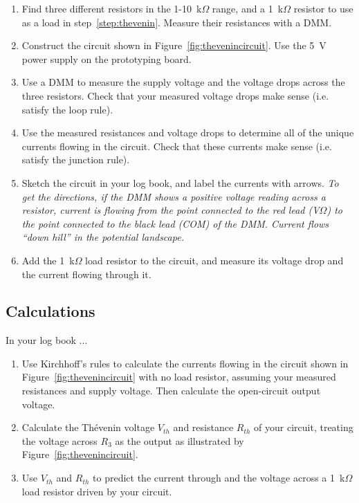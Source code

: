 \documentclass[11pt]{article}
\begin{document}
\begin{enumerate}
\item Find three different resistors in the 1-10~k$\Omega$ range, and
  a 1~k$\Omega$ resistor to use as a load in
  step~\ref{step:thevenin}. Measure their resistances with a DMM.

\item Construct the circuit shown in
  Figure~\ref{fig:thevenincircuit}. Use the 5~V power supply on the
  prototyping board.

\item Use a DMM to measure the supply voltage and the voltage drops
  across the three resistors. Check that your measured voltage drops
  make sense (i.e. satisfy the loop rule).

\item Use the measured resistances and voltage drops to determine all
  of the unique currents flowing in the circuit. Check that these
  currents make sense (i.e. satisfy the junction rule).

\item Sketch the circuit in your log book, and label the currents with
  arrows. \textit{To get the directions, if the DMM shows a positive
  voltage reading across a resistor, current is flowing from the
  point connected to the red lead (V$\Omega$) to the point connected
  to the black lead (COM) of the DMM. Current flows ``down hill'' in
  the potential landscape.}

\item \label{step:thevenin} Add the 1~k$\Omega$ load resistor to the
  circuit, and measure its voltage drop and the current flowing
  through it.
\end{enumerate}

\subsection*{Calculations}

In your log book ...

\begin{enumerate}
\item Use Kirchhoff's rules to calculate the currents flowing in the
  circuit shown in Figure~\ref{fig:thevenincircuit} with no load
  resistor, assuming your measured resistances and supply
  voltage. Then calculate the open-circuit output voltage.

\item Calculate the Th\'{e}venin voltage $V_{th}$ and resistance
  $R_{th}$ of your circuit, treating the voltage across $R_3$ as the
  output as illustrated by Figure~\ref{fig:thevenincircuit}.

\item Use $V_{th}$ and $R_{th}$ to predict the current through and
  the voltage across a 1~k$\Omega$ load resistor driven by your
  circuit.
\end{enumerate}
\end{document}
